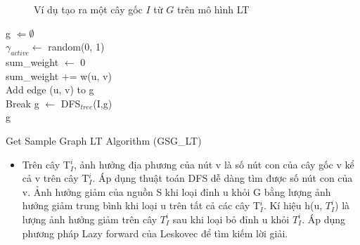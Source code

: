 \begin{figure}[H]
\hfill
{}\hfill
{}
\caption{Ví dụ tạo ra một cây gốc $I$ từ $G$ trên mô hình LT}
\label{example}
\end{figure}	
\begin{algorithm}[H]
g $\Leftarrow \emptyset$
\\
{	
	$\gamma_{active} \leftarrow$ random(0, 1)
	\\
	sum\_weight $\leftarrow$ 0
	\\
	{
		sum\_weight += w(u, v)
		\\
		{
			Add edge (u, v) to g
			\\
			Break
		}
	}
}		
g $\leftarrow$ DFS$_{tree}$(I,g)
\\
\Return g
\caption{Get Sample Graph LT Algorithm (GSG\_{LT})}
\label{GSGLT}
\end{algorithm}	
\begin {itemize}
\item Trên cây T$_{I}^i$, ảnh hưởng địa phương của nút v là số nút con của cây gốc v kể cả v trên cây T$_{I}^i$. Áp dụng thuật toán DFS dễ dàng tìm được số nút con của v. Ảnh hưởng giảm của nguồn S khi loại đỉnh u khỏi G bằng lượng ảnh hưởng giảm trung bình khi loại u trên tất cả các cây T$_{I}^i$. Kí hiệu h(u, $T_I^i$) là lượng ảnh hưởng giảm trên cây $T_I^i$ sau khi loại bỏ đỉnh u khỏi $T_I^i$. Áp dụng phương pháp Lazy forward của Leskovec \cite{lazy} để tìm kiếm lời giải. 
\end {itemize}

